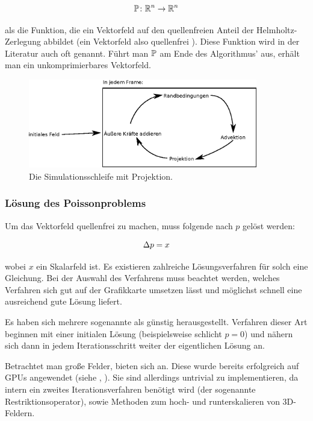 \begin{equation}
\mathbb{P} \colon \mathbb{R}^n \to \mathbb{R}^n
\end{equation}

als die Funktion, die ein Vektorfeld auf den quellenfreien Anteil der
Helmholtz-Zerlegung abbildet (ein Vektorfeld also quellenfrei
). Diese Funktion wird in der Literatur auch oft
 genannt. Führt man $\mathbb{P}$ am Ende des
Algorithmus' aus, erhält man ein unkomprimierbares Vektorfeld.

\begin{figure}[ht]
\includegraphics[width=10cm]{images/stam_loop_with_projection}
\caption{Die Simulationsschleife mit Projektion.}
\end{figure}

\subsubsection{Lösung des Poissonproblems}

Um das Vektorfeld quellenfrei zu machen, muss folgende
 nach $p$ gelöst werden:

\begin{equation}
\Delta{p} = x
\end{equation}

wobei $x$ ein Skalarfeld ist. Es existieren zahlreiche Lösungsverfahren für solch
eine Gleichung. Bei der Auswahl des Verfahrens muss beachtet werden, welches
Verfahren sich gut auf der Grafikkarte umsetzen lässt und möglichst schnell eine
ausreichend gute Lösung liefert.

Es haben sich mehrere sogenannte  als
günstig herausgestellt. Verfahren dieser Art beginnen mit einer initialen Lösung
(beispielsweise schlicht $p=0$) und nähern sich dann in jedem Iterationsschritt
weiter der eigentlichen Lösung an.

Betrachtet man große Felder, bieten sich 
an. Diese wurde bereits erfolgreich auf GPUs angewendet (siehe \cite{Bolz2002},
\cite{Matthias2006}). Sie sind allerdings untrivial zu implementieren, da intern
ein zweites Iterationsverfahren benötigt wird (der sogenannte
Restriktionsoperator), sowie Methoden zum hoch- und runterskalieren von
3D-Feldern.

